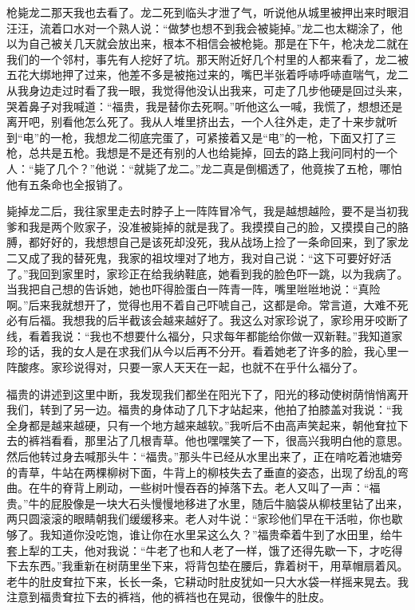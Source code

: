 \documentclass[12pt,UTF8]{ctexbook}
\begin{document}
枪毙龙二那天我也去看了。龙二死到临头才泄了气，听说他从城里被押出来时眼泪汪汪，流着口水对一个熟人说：“做梦也想不到我会被毙掉。”龙二也太糊涂了，他以为自己被关几天就会放出来，根本不相信会被枪毙。那是在下午，枪决龙二就在我们的一个邻村，事先有人挖好了坑。那天附近好几个村里的人都来看了，龙二被五花大绑地押了过来，他差不多是被拖过来的，嘴巴半张着呼哧呼哧直喘气，龙二从我身边走过时看了我一眼，我觉得他没认出我来，可走了几步他硬是回过头来，哭着鼻子对我喊道：“福贵，我是替你去死啊。”听他这么一喊，我慌了，想想还是离开吧，别看他怎么死了。我从人堆里挤出去，一个人往外走，走了十来步就听到“电”的一枪，我想龙二彻底完蛋了，可紧接着又是“电”的一枪，下面又打了三枪，总共是五枪。我想是不是还有别的人也给毙掉，回去的路上我问同村的一个人：“毙了几个？”他说：“就毙了龙二。”龙二真是倒楣透了，他竟挨了五枪，哪怕他有五条命也全报销了。

毙掉龙二后，我往家里走去时脖子上一阵阵冒冷气，我是越想越险，要不是当初我爹和我是两个败家子，没准被毙掉的就是我了。我摸摸自己的脸，又摸摸自己的胳膊，都好好的，我想想自己是该死却没死，我从战场上捡了一条命回来，到了家龙二又成了我的替死鬼，我家的祖坟埋对了地方，我对自己说：“这下可要好好活了。”我回到家里时，家珍正在给我纳鞋底，她看到我的脸色吓一跳，以为我病了。当我把自己想的告诉她，她也吓得脸蛋白一阵青一阵，嘴里咝咝地说：“真险啊。”后来我就想开了，觉得也用不着自己吓唬自己，这都是命。常言道，大难不死必有后福。我想我的后半截该会越来越好了。我这么对家珍说了，家珍用牙咬断了线，看着我说：“我也不想要什么福分，只求每年都能给你做一双新鞋。”我知道家珍的话，我的女人是在求我们从今以后再不分开。看着她老了许多的脸，我心里一阵酸疼。家珍说得对，只要一家人天天在一起，也就不在乎什么福分了。

福贵的讲述到这里中断，我发现我们都坐在阳光下了，阳光的移动使树荫悄悄离开我们，转到了另一边。福贵的身体动了几下才站起来，他拍了拍膝盖对我说：“我全身都是越来越硬，只有一个地方越来越软。”我听后不由高声笑起来，朝他耷拉下去的裤裆看看，那里沾了几根青草。他也嘿嘿笑了一下，很高兴我明白他的意思。然后他转过身去喊那头牛：“福贵。”那头牛已经从水里出来了，正在啃吃着池塘旁的青草，牛站在两棵柳树下面，牛背上的柳枝失去了垂直的姿态，出现了纷乱的弯曲。在牛的脊背上刷动，一些树叶慢吞吞的掉落下去。老人又叫了一声：“福贵。”牛的屁股像是一块大石头慢慢地移进了水里，随后牛脑袋从柳枝里钻了出来，两只圆滚滚的眼睛朝我们缓缓移来。老人对牛说：“家珍他们早在干活啦，你也歇够了。我知道你没吃饱，谁让你在水里呆这么久？”福贵牵着牛到了水田里，给牛套上犁的工夫，他对我说：“牛老了也和人老了一样，饿了还得先歇一下，才吃得下去东西。”我重新在树荫里坐下来，将背包垫在腰后，靠着树干，用草帽扇着风。老牛的肚皮耷拉下来，长长一条，它耕动时肚皮犹如一只大水袋一样摇来晃去。我注意到福贵耷拉下去的裤裆，他的裤裆也在晃动，很像牛的肚皮。
\end{document}
